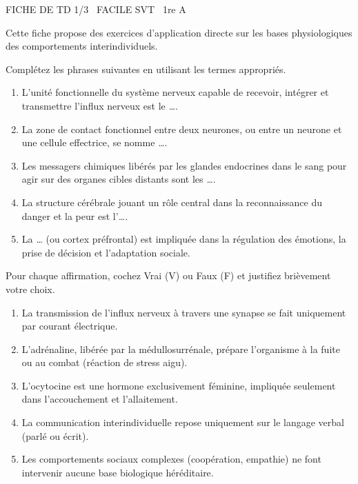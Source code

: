 \documentclass[11pt]{article}
\begin{document}
\begin{tcolorbox}[enhanced,colback=popink,colframe=popink,arc=10pt,boxrule=0pt,left=12pt,right=12pt,top=9pt,bottom=9pt]
{\color{white}\popxbold\small FICHE DE TD 1/3 \textbullet\ FACILE \hfill SVT \textbullet\ 1re A\par}
\end{tcolorbox}
\vspace{4pt}
Cette fiche propose des exercices d'application directe sur les bases physiologiques des comportements interindividuels.

\begin{exercice}
Complétez les phrases suivantes en utilisant les termes appropriés.
\begin{enumerate}
    \item L'unité fonctionnelle du système nerveux capable de recevoir, intégrer et transmettre l'influx nerveux est le \textit{\dots}.
    \item La zone de contact fonctionnel entre deux neurones, ou entre un neurone et une cellule effectrice, se nomme \textit{\dots}.
    \item Les messagers chimiques libérés par les glandes endocrines dans le sang pour agir sur des organes cibles distants sont les \textit{\dots}.
    \item La structure cérébrale jouant un rôle central dans la reconnaissance du danger et la peur est l'\textit{\dots}.
    \item La \textit{\dots} (ou cortex préfrontal) est impliquée dans la régulation des émotions, la prise de décision et l'adaptation sociale.
\end{enumerate}
\end{exercice}

\begin{exercice}
Pour chaque affirmation, cochez Vrai (V) ou Faux (F) et justifiez brièvement votre choix.
\begin{enumerate}
    \item La transmission de l'influx nerveux à travers une synapse se fait uniquement par courant électrique.
    \item L'adrénaline, libérée par la médullosurrénale, prépare l'organisme à la fuite ou au combat (réaction de stress aigu).
    \item L'ocytocine est une hormone exclusivement féminine, impliquée seulement dans l'accouchement et l'allaitement.
    \item La communication interindividuelle repose uniquement sur le langage verbal (parlé ou écrit).
    \item Les comportements sociaux complexes (coopération, empathie) ne font intervenir aucune base biologique héréditaire.
\end{enumerate}
\end{exercice}
\end{document}
